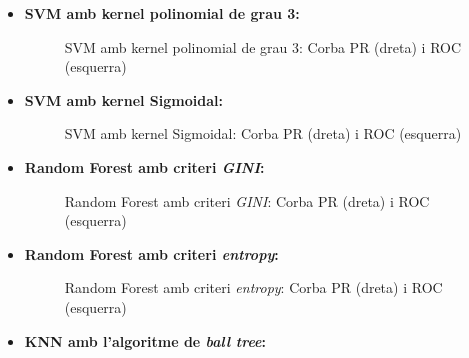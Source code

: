 \documentclass[a4paper, 11pt]{article}
\begin{document}
\begin{itemize}
            \item \textbf{SVM amb kernel polinomial de grau 3:}


                \begin{figure}[H]%
                \centering
                \qquad
                \caption*{SVM amb kernel polinomial de grau 3: Corba PR (dreta) i ROC (esquerra)}
                \end{figure}


            \item \textbf{SVM amb kernel Sigmoidal:}


                \begin{figure}[H]%
                \centering
                \qquad
                \caption*{SVM amb kernel Sigmoidal: Corba PR (dreta) i ROC (esquerra)}
                \end{figure}

            \item \textbf{Random Forest amb criteri \textit{GINI}:}


                \begin{figure}[H]%
                \centering
                \qquad
                \caption*{Random Forest amb criteri \textit{GINI}: Corba PR (dreta) i ROC (esquerra)}
                \end{figure}

            \item \textbf{Random Forest amb criteri \textit{entropy}:}


                \begin{figure}[H]%
                \centering
                \qquad
                \caption*{Random Forest amb criteri \textit{entropy}: Corba PR (dreta) i ROC (esquerra)}
                \end{figure}

            \item \textbf{KNN amb l'algoritme de \textit{ball tree}:}



\end{itemize}
\end{document}
